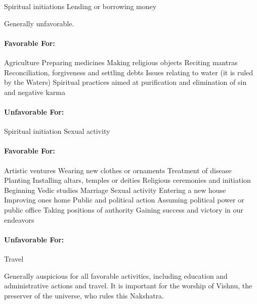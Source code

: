 Spiritual initiations
Lending or borrowing money
 


Generally unfavorable.

 

\paragraph{Favorable For:}

Agriculture
Preparing medicines
Making religious objects
Reciting mantras
Reconciliation, forgiveness and settling debts
Issues relating to water (it is ruled by the Waters)
Spiritual practices aimed at purification and elimination of sin and negative karma
 

\paragraph{Unfavorable For:}

Spiritual initiation
Sexual activity
 


 

\paragraph{Favorable For:}

Artistic ventures
Wearing new clothes or ornaments
Treatment of disease
Planting
Installing altars, temples or deities
Religious ceremonies and initiation
Beginning Vedic studies
Marriage
Sexual activity
Entering a new house
Improving ones home
Public and political action
Assuming political power or public office
Taking positions of authority
Gaining success and victory in our endeavors
 

\paragraph{Unfavorable For:}

Travel
 


Generally auspicious for all favorable activities, including education and administrative actions and travel. It is important for the worship of Vishnu, the preserver of the universe, who rules this Nakshatra.

 

